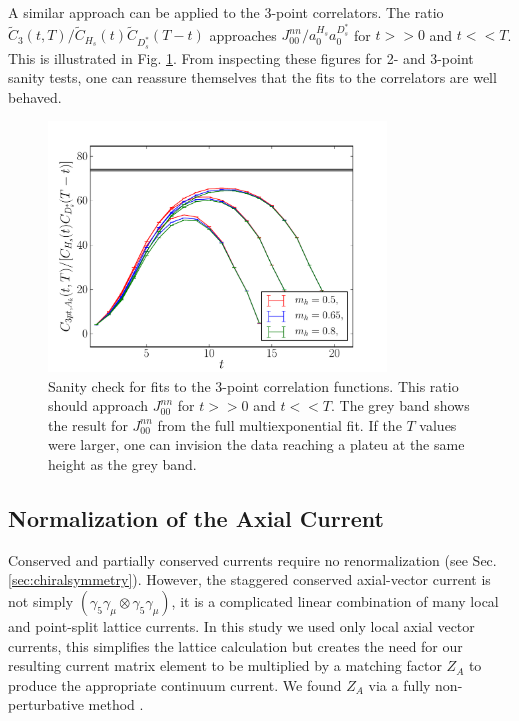 A similar approach can be applied to the 3-point correlators. The ratio $\tilde{C}_3(t,T)/\tilde{C}_{H_s}(t) \tilde{C}_{D_s^*}(T-t)$ approaches $J_{00}^{nn}/a_0^{H_s}a_0^{D^*_s}$ for $t>>0$ and $t<<T$. This is illustrated in Fig. \ref{eq:3pt-summary_BsDsstar}. From inspecting these figures for 2- and 3-point sanity tests, one can reassure themselves that the fits to the correlators are well behaved.

\begin{figure}[htb!]
  \begin{center}
    \vspace{-10pt}
  \includegraphics[width=0.8\textwidth]{images/BsDsstar/3ptsummary_fine.pdf}
  \caption{Sanity check for fits to the 3-point correlation functions. This ratio should approach $J_{00}^{nn}$ for $t>>0$ and $t<<T$. The grey band shows the result for $J_{00}^{nn}$ from the full multiexponential fit. If the $T$ values were larger, one can invision the data reaching a plateu at the same height as the grey band. \label{eq:3pt-summary_BsDsstar}}
  \end{center}
  \vspace{-10pt}
\end{figure}

\subsection{Normalization of the Axial Current}

Conserved and partially conserved currents require no renormalization (see Sec. \ref{sec:chiralsymmetry}). However, the staggered conserved axial-vector current is not simply $(\gamma_5\gamma_{\mu}\otimes \gamma_5\gamma_{\mu})$, it is a complicated linear combination of many local and point-split lattice currents. In this study we used only local axial vector currents, this simplifies the lattice calculation but creates the need for our resulting current matrix element to be multiplied by a matching factor $Z_A$ to produce the appropriate continuum current. We found $Z_A$ via a fully non-perturbative method \cite{McNeile:2011ng,Donald:2013pea}.

